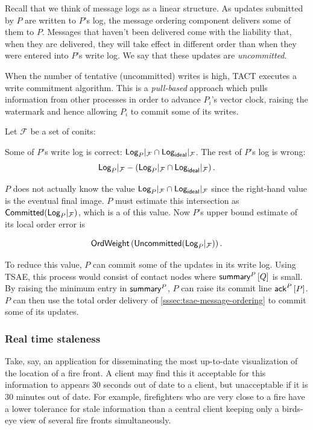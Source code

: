 \documentclass[]             %
{NASA}                       %
\theoremstyle{definition}
\begin{document}
Recall that we think of message logs as a linear structure. As updates
submitted by $P$ are written to $P$'s log, the message ordering
component delivers some of them to $P$. Messages that haven't been
delivered come with the liability that, when they are delivered, they
will take effect in different order than when they were entered into
$P$'s write log. We say that these updates are \emph{uncommitted}.


When the number of tentative (uncommitted) writes is high, TACT
executes a write commitment algorithm. This is a \emph{pull-based}
approach which pulls information from other processes in order to
advance \(P_i\)'s vector clock, raising the watermark and hence
allowing \(P_i\) to commit some of its writes.

Let $\mathcal{F}$ be a set of conits:

Some of $P$'s write log is correct:
$\textsf{Log}_{P}|_{\mathcal{F}} \cap \textsf{Log}_{\mathsf{ideal}}|_{\mathcal{F}}$. The rest of $P$'s log is wrong:
\[\textsf{Log}_{P}|_\mathcal{F} - \left(\textsf{Log}_{P}|_{\mathcal{F}} \cap
    \textsf{Log}_{\mathsf{ideal}}|_{\mathcal{F}}\right).\]

$P$ does not actually know the value
$\textsf{Log}_{P}|_{\mathcal{F}} \cap \textsf{Log}_{\mathsf{ideal}}|_{\mathcal{F}}$ since
the right-hand value is the eventual final image. $P$ must estimate
this intersection as
$\mathsf{Committed}{\left(\textsf{Log}_{P}|_{\mathcal{F}}\right)}$, which is a of
  this value. Now $P$'s upper bound estimate of its local order error
  is

  \[\mathsf{OrdWeight}\left(\mathsf{Uncommitted}{\left(\textsf{Log}_{P}|_{\mathcal{F}}\right)}\right).\]

    To reduce this value, $P$ can commit some of the updates in its
    write log. Using TSAE, this process would consist of contact nodes
    where $\textsf{summary}^{P}\left[Q\right]$ is small. By raising the minimum entry in
    $\textsf{summary}^{P}$, $P$ can raise its commit line $\textsf{ack}^{P}\left[P\right]$.$P$
    can then use the total order delivery of
    \ref{sssec:tsae-message-ordering} to commit some of its updates.

\subsubsection{Real time staleness}
\label{sssec:conit-real-time-consistency}
Take, say, an application for disseminating the most up-to-date
visualization of the location of a fire front. A client may find this
it acceptable for this information to appears 30 seconds out of date
to a client, but unacceptable if it is 30 minutes out of date. For
example, firefighters who are very close to a fire have a lower
tolerance for stale information than a central client keeping only a
birds-eye view of several fire fronts simultaneously.
\end{document}
